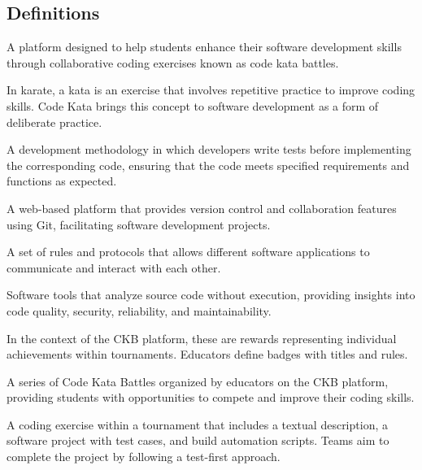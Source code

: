 \subsection{Definitions}
\begin{description}[leftmargin=0pt]
    \item[CodeKataBattle (CKB):] A platform designed to help students enhance their software development skills through collaborative coding exercises known as code kata battles.

    \item[Kata:] In karate, a kata is an exercise that involves repetitive practice to improve coding skills. Code Kata brings this concept to software development as a form of deliberate practice.

    \item[Test-First Approach:] A development methodology in which developers write tests before implementing the corresponding code, ensuring that the code meets specified requirements and functions as expected.

    \item[GitHub:] A web-based platform that provides version control and collaboration features using Git, facilitating software development projects. \cite{GitHub}

    \item[API (Application Programming Interface):] A set of rules and protocols that allows different software applications to communicate and interact with each other.

    \item[Static Analysis Tools:] Software tools that analyze source code without execution, providing insights into code quality, security, reliability, and maintainability.

    \item[Gamification Badges:] In the context of the CKB platform, these are rewards representing individual achievements within tournaments. Educators define badges with titles and rules.

    \item[Tournament:] A series of Code Kata Battles organized by educators on the CKB platform, providing students with opportunities to compete and improve their coding skills.

    \item[Battle:] A coding exercise within a tournament that includes a textual description, a software project with test cases, and build automation scripts. Teams aim to complete the project by following a test-first approach.


\end{description}
